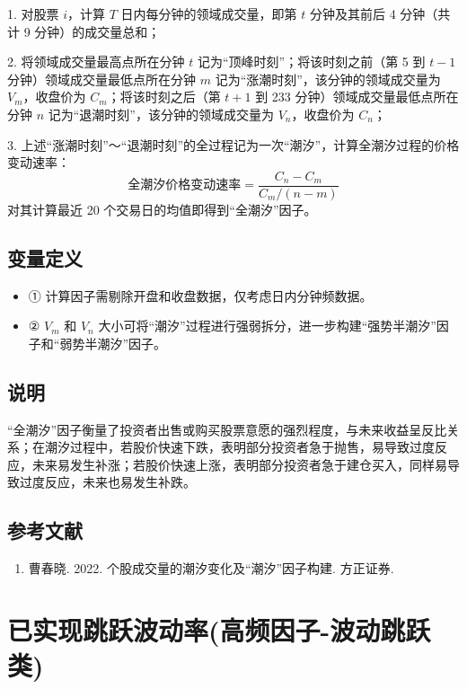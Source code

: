 \documentclass{article}
\begin{document}
1. 对股票 \( i \)，计算 \( T \) 日内每分钟的领域成交量，即第 \( t \) 分钟及其前后 4 分钟（共计 9 分钟）的成交量总和；

2. 将领域成交量最高点所在分钟 \( t \) 记为“顶峰时刻”；将该时刻之前（第 5 到 \( t-1 \) 分钟）领域成交量最低点所在分钟 \( m \) 记为“涨潮时刻”，该分钟的领域成交量为 \( V_m \)，收盘价为 \( C_m \)；将该时刻之后（第 \( t+1 \) 到 233 分钟）领域成交量最低点所在分钟 \( n \) 记为“退潮时刻”，该分钟的领域成交量为 \( V_n \)，收盘价为 \( C_n \)；

3. 上述“涨潮时刻”～“退潮时刻”的全过程记为一次“潮汐”，计算全潮汐过程的价格变动速率：
\begin{equation}
    \text{全潮汐价格变动速率} = \frac{C_n - C_m}{C_m / (n-m)}
\end{equation}
对其计算最近 20 个交易日的均值即得到“全潮汐”因子。

\subsection{变量定义}
\begin{itemize}
    \item ① 计算因子需剔除开盘和收盘数据，仅考虑日内分钟频数据。
    \item ② \( V_m \) 和 \( V_n \) 大小可将“潮汐”过程进行强弱拆分，进一步构建“强势半潮汐”因子和“弱势半潮汐”因子。
\end{itemize}

\subsection{说明}
“全潮汐”因子衡量了投资者出售或购买股票意愿的强烈程度，与未来收益呈反比关系；在潮汐过程中，若股价快速下跌，表明部分投资者急于抛售，易导致过度反应，未来易发生补涨；若股价快速上涨，表明部分投资者急于建仓买入，同样易导致过度反应，未来也易发生补跌。

\subsection{参考文献}
\begin{enumerate}
    \item 曹春晓. 2022. 个股成交量的潮汐变化及“潮汐”因子构建. 方正证券.
\end{enumerate}

\section{已实现跳跃波动率(高频因子-波动跳跃类)}
\end{document}
